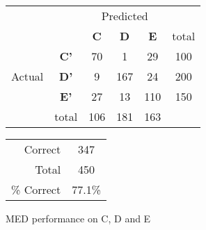 \begin{figure}[!ht]
\begin{minipage}[b]{0.5\linewidth}
\centering
	\begin{tabular}{ccc|c|c|c}
	 & &\multicolumn{3}{c}{Predicted} &\\
	  & & \bf{C} &  \bf{D} & \bf{E} & total \\
	 \cline{3-5}
	 \multirow{3}{*}{\begin{sideways}Actual\end{sideways}} & \bf{C'}& 70 & 1 & 29 & 100\\
	 \cline{3-6}
	 & \bf{D'}& 9 & 167 & 24 & 200\\
	  \cline{3-6}
	 & \bf{E'}& 27 & 13 & 110 &  150\\
	  \cline{3-6}
	 &total&106&181&163\\
	\end{tabular}
\end{minipage}
\hspace{0.5cm}
\begin{minipage}[b]{0.5\linewidth}
	\begin{tabular}{r|c}
	\hline
	Correct& 347\\
	Total& 450\\
	\hline
	\% Correct& 77.1\%\\
	\hline
	\end{tabular}
\end{minipage}
\vspace{1mm}
\caption{MED performance on C, D and E}
\end{figure}

\clearpage

